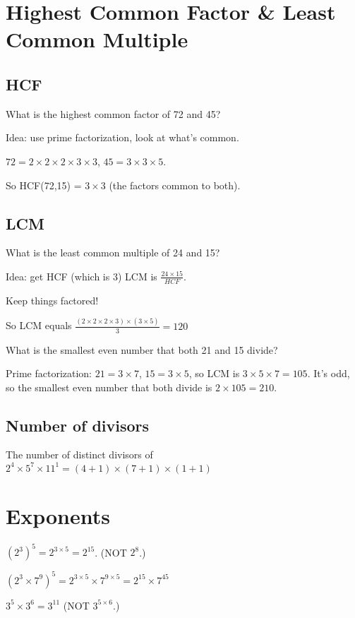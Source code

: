 \documentclass[fullpage,twocolumn]{article}
\begin{document}
\section{
Highest Common Factor \& Least Common Multiple
}


\subsection{HCF}
What is the highest common factor of 72 and 45?

Idea: use prime factorization, look at what's common.

$72 = 2 \times 2 \times 2 \times 3 \times 3 $, $45 = 3 \times 3 \times 5$.

So HCF(72,15) = $ 3 \times 3 $ (the factors common to both).

\subsection{LCM}

What is the least common multiple of 24 and 15?

Idea:  get HCF (which is 3)
LCM is $\frac{24 \times 15}{HCF}$.

Keep things factored!

So LCM equals 
$\frac{(2 \times 2 \times 2 \times 3) \times (3 \times 5)}{ 3} = 120$

What is the smallest even number that both 21 and 15 divide?

Prime factorization: $21 = 3 \times 7$, $15 = 3 \times 5$, so LCM is 
$3 \times 5 \times 7 = 105$. It's odd, so the smallest even number
that both divide is $2 \times 105 = 210$.

\subsection{Number of divisors}

The number of distinct divisors of $2^4\times 5^7 \times 11^1 = (4+1)\times(7+1)\times(1+1)$

\section{Exponents}

$(2^3)^5 = 2^{3 \times 5} = 2^{15}$. (NOT $2^{8}$.)

$(2^3 \times 7^9)^5 = 2^{3 \times 5}  \times 7^{9 \times 5}= 2^{15} \times 7^{45}$

$3^5 \times 3^6 = 3^{11}$ (NOT $3^{5 \times 6}$.)
\end{document}
